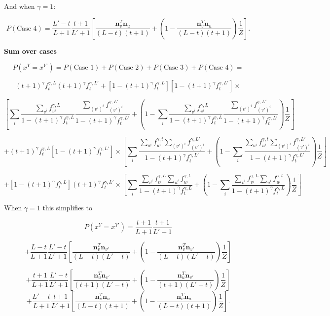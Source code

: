\documentclass{article}
\begin{document}
And when $\gamma = 1$:

$$P(\textrm{Case 4}) = \frac{L'-t}{L+1}\frac{t+1}{L'+1}\left[
\frac{\mathbf{n}^T_{v}\mathbf{n}_{u}}{(L-t)(t+1)} + \left(1 - \frac{\mathbf{n}^T_{v}\mathbf{n}_{u}}{(L-t)(t+1)} \right)\frac{1}{Z}
\right].$$

\textbf{Sum over cases}

$$P(x^Y = x^{Y'}) = P(\textrm{Case 1}) + P(\textrm{Case 2}) + P(\textrm{Case 3}) + P(\textrm{Case 4}) = $$

$$
(t+1)^\gamma f^{\gamma,L}_t(t+1)^\gamma f^{\gamma,L'}_t + [1 - (t+1)^\gamma f^{\gamma,L}_t][1 - (t+1)^\gamma f^{\gamma,L'}_t] \times$$

$$\left[
\sum_i \frac{\sum\limits_{v^i} f^{\gamma,L}_{v^i}}{1 - (t+1)^\gamma f^{\gamma,L}_t} \frac{\sum\limits_{(v')^i} f^{\gamma,L'}_{(v')^i}}{1 - (t+1)^\gamma f^{\gamma,L'}_t} + \left(1 - \sum_i \frac{\sum\limits_{v^i} f^{\gamma,L}_{v^i}}{1 - (t+1)^\gamma f^{\gamma,L}_t} \frac{\sum\limits_{(v')^i} f^{\gamma,L'}_{(v')^i}}{1 - (t+1)^\gamma f^{\gamma,L'}_t}\right)\frac{1}{Z}
\right]$$

$$+(t+1)^\gamma f^{\gamma,L}_t[1-(t+1)^\gamma f^{\gamma,L'}_t] \times 
\left[
\sum_i \frac{\sum\limits_{u^i} f_{u^i}^{\gamma, t} \sum\limits_{(v')^i} f_{(v')^i}^{\gamma,L'}}{1 - (t+1)^\gamma f^{\gamma,L'}_t} 
+ \left(1 - \sum_i \frac{\sum\limits_{u^i} f_{u^i}^{\gamma, t} \sum\limits_{(v')^i} f_{(v')^i}^{\gamma,L'}}{1 - (t+1)^\gamma f^{\gamma,L'}_t}\right)\frac{1}{Z}
\right]
$$

$$+[1 - (t+1)^\gamma f^{\gamma,L}_t](t+1)^\gamma f^{\gamma,L'}_t \times \left[
\sum_i \frac{\sum\limits_{v^i} f_{v^i}^{\gamma,L}\sum\limits_{u^i} f_{u^i}^{\gamma, t}}{1 - (t+1)^\gamma f^{\gamma,L}_t} 
+ \left(1 - \sum_i \frac{\sum\limits_{v^i} f_{v^i}^{\gamma,L}\sum\limits_{u^i} f_{u^i}^{\gamma, t}}{1 - (t+1)^\gamma f^{\gamma,L}_t}\right)\frac{1}{Z}
\right]
$$

When $\gamma = 1$ this simplifies to

$$P(x^Y = x^{Y'}) =  \frac{t+1}{L+1}\frac{t+1}{L'+1}$$

$$
+ \frac{L-t}{L+1}\frac{L'-t}{L'+1}\left[\frac{\mathbf{n}^T_v\mathbf{n}_{v'}}{(L-t)(L'-t)} + \left(1 - \frac{\mathbf{n}^T_v\mathbf{n}_{v'}}{(L-t)(L'-t)} \right)\frac{1}{Z}\right]
$$

$$+\frac{t+1}{L+1}\frac{L'-t}{L'+1}\left[
\frac{\mathbf{n}^T_{u}\mathbf{n}_{v'}}{(t+1)(L'-t)}+ \left(1 - \frac{\mathbf{n}^T_{u}\mathbf{n}_{v'}}{(t+1)(L'-t)} \right)\frac{1}{Z}
\right]$$
$$
+\frac{L'-t}{L+1}\frac{t+1}{L'+1}\left[
\frac{\mathbf{n}^T_{v}\mathbf{n}_{u}}{(L-t)(t+1)} + \left(1 - \frac{\mathbf{n}^T_{v}\mathbf{n}_{u}}{(L-t)(t+1)} \right)\frac{1}{Z}
\right].
$$
\end{document}

